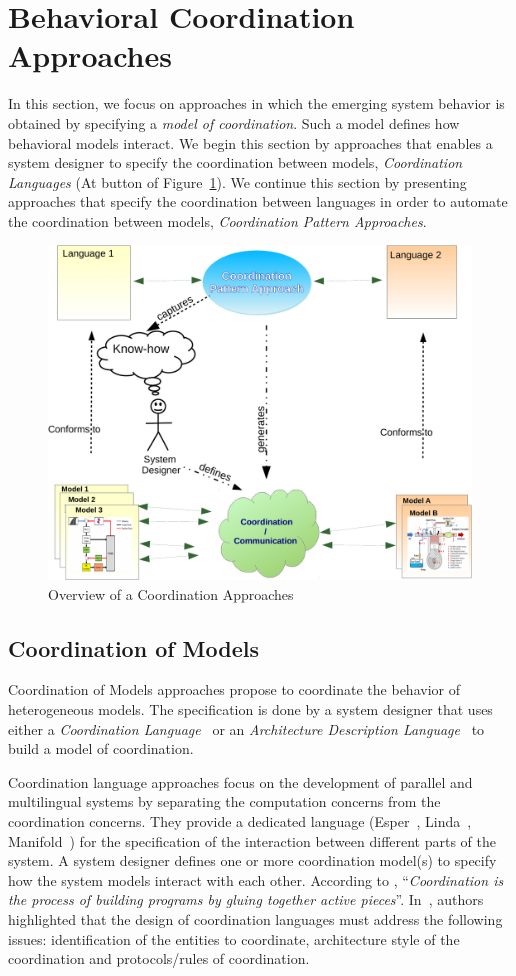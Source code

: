 \section{Behavioral Coordination Approaches}

In this section, we focus on approaches in which the emerging system behavior is obtained by specifying a \emph{model of coordination}. Such a model defines how behavioral models interact. We begin this section by approaches that enables a system designer to specify the coordination between models, \ie \emph{Coordination Languages} (At button of Figure~\ref{fig:coordapp}). We continue this section by presenting approaches that specify the coordination between languages in order to automate the coordination between models, \ie \emph{Coordination Pattern Approaches}.

\begin{figure}
      \begin{center}
         			\includegraphics[width=0.6\columnwidth]{background/figs/coordpatterapp}
         			\caption{Overview of a Coordination Approaches}
         			\label{fig:coordapp}
        \end{center}
\end{figure}


\subsection{Coordination of Models}
Coordination of Models approaches propose to coordinate the behavior of heterogeneous models. The specification is done by a system designer that uses either a \emph{Coordination Language}~\cite{coordmodels} or an \emph{Architecture Description Language}~\cite{frameadlsbib} to build a model of coordination. 
			 
Coordination language approaches focus on the development of parallel and multilingual systems by separating the computation concerns from the coordination concerns. They provide a dedicated language (\eg Esper~\cite{esperbib}, Linda~\cite{lindabib}, Manifold~\cite{manifoldbib}) for the specification of the interaction between different parts of the system.  A system designer defines one or more coordination model(s) to specify how the system models interact with each other. According to \cite{coordsignibib}, ``\textit{Coordination is the process of building programs by gluing together active pieces}''. In~\cite{wegnercoorbib}, authors highlighted that the design of coordination languages must address the following issues: identification of the entities to coordinate, architecture style of the coordination and protocols/rules of coordination.
			 
